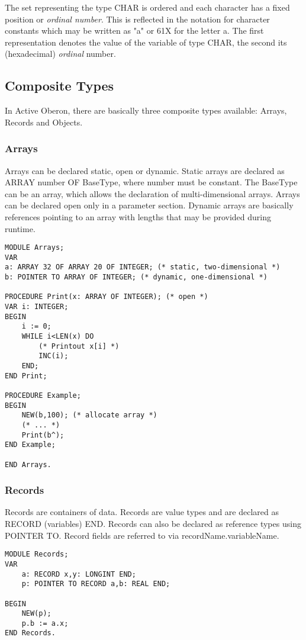 \documentclass[a4paper,11pt]{article}
\begin{document}
The set representing the type CHAR is ordered and each character has a fixed position or {\em ordinal number}. This is reflected in the notation for character constants which may be written as "a" or 61X for the letter a. The first representation denotes the value of the variable of type CHAR, the second its (hexadecimal) {\em ordinal} number.

\subsection{Composite Types}\label{section:CompositeTypes}

In Active Oberon, there are basically three composite types available: Arrays, Records and Objects.

\subsubsection{Arrays}\label{section:Arrays}
Arrays can be declared static, open or dynamic. Static arrays are declared as ARRAY number OF BaseType, where number must be constant. The BaseType can be an array, which allows the declaration of multi-dimensional arrays. Arrays can be declared open only in a parameter section. Dynamic arrays are basically references pointing to an array with lengths that may be provided during runtime.

\begin{lstlisting}[language=Oberon,frame=none,caption=Using arrays]
MODULE Arrays;
VAR
a: ARRAY 32 OF ARRAY 20 OF INTEGER; (* static, two-dimensional *)
b: POINTER TO ARRAY OF INTEGER; (* dynamic, one-dimensional *)

PROCEDURE Print(x: ARRAY OF INTEGER); (* open *)
VAR i: INTEGER;
BEGIN
    i := 0;
    WHILE i<LEN(x) DO
        (* Printout x[i] *)
        INC(i);
    END;
END Print;

PROCEDURE Example;
BEGIN
    NEW(b,100); (* allocate array *)
    (* ... *)
    Print(b^);
END Example;

END Arrays.
\end{lstlisting}

\subsubsection{Records}\label{section:Records}
Records are containers of data. Records are value types and are declared as RECORD (variables) END. Records can also be declared as reference types using POINTER TO. Record fields are referred to via recordName.variableName.
\begin{lstlisting}[language=Oberon,frame=none,caption=Using records]
MODULE Records;
VAR
	a: RECORD x,y: LONGINT END;
	p: POINTER TO RECORD a,b: REAL END;

BEGIN
	NEW(p);
	p.b := a.x;
END Records.
\end{lstlisting}
\end{document}

